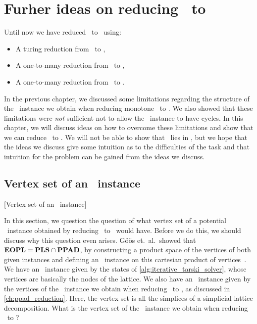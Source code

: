\setchapterpreamble[u]{\margintoc}
\chapter{Furher ideas on reducing \Tarski\ to \EOPL}\label{ch:eopl_reduction}

Until now we have reduced \Tarski\ to \EndOfLine\ using:
\begin{itemize}
	\item A turing reduction from \Tarski\ to \Tarskistar,
	\item A one-to-many reduction from \Tarskistar\ to \Sperner,
	\item A one-to-many reduction from \Sperner\ to \EndOfLine.
\end{itemize}
In the previous chapter, we discussed some limitations regarding the structure of the \Sperner\ instance we obtain when reducing monotone \Tarskistar\ to \Sperner. We also showed that these limitations were \emph{not} sufficient not to allow the \EndOfLine\ instance to have cycles. In this chapter, we will discuss ideas on how to overcome these limitations and show that we can reduce \Tarski\ to \EndOfPotentialLine\@. We will not be able to show that \Tarski\ lies in \EOPL, but we hope that the ideas we discuss give some intuition as to the difficulties of the task and that intuition for the problem can be gained from the ideas we discuss.

\section{Vertex set of an \EOPL\ instance}[Vertex set of an \EOPL\ instance]

In this section, we question the question of what vertex set of a potential \EOPL\ instance obtained by reducing \Tarskistar\ to \EndOfPotentialLine\ would have. Before we do this, we should discuss why this question even arises. Göös et.\ al.\ showed that $\textbf{EOPL} = \textbf{PLS} \cap \textbf{PPAD}$, by constructing a product space of the vertices of both given instances and defining an \EndOfPotentialLine\ instance on this cartesian product of vertices~. We have an \Localopt\ instance given by the states of \cref{alg:iterative_tarski_solver}, whose vertices are basically the nodes of the lattice. We also have an \EndOfLine\ instance given by the vertices of the \Sperner\ instance we obtain when reducing \Tarskistar\ to \Sperner, as discussed in \cref{ch:ppad_reduction}. Here, the vertex set is all the simplices of a simplicial lattice decomposition. What is the vertex set of the \EndOfPotentialLine\ instance we obtain when reducing \Tarskistar\ to \EndOfLine\@?


